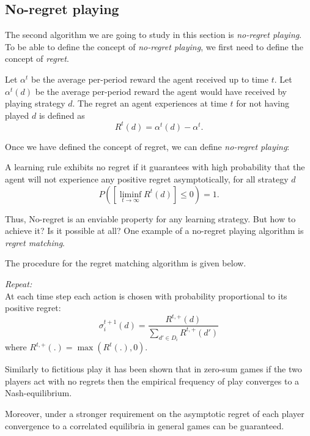 \subsection{No-regret playing}
The second algorithm we are going to study in this section is \emph{no-regret
playing}. To be able to define the concept of \emph{no-regret playing}, we
first need to define the concept of \emph{regret}.

\begin{definition}[Regret]
    Let $\alpha^t$ be the average per-period reward the agent received up to time
    $t$. Let $\alpha^t(d)$ be the average per-period reward the agent would have
    received by playing strategy $d$. The regret an agent experiences at
    time $t$ for not having played $d$ is defined as
    $$R^t(d) = \alpha^t(d) - \alpha^t.$$
\end{definition}

Once we have defined the concept of regret, we can define \emph{no-regret playing}:

\begin{definition}
    A learning rule exhibits no regret if it guarantees with high probability that
    the agent will not experience any positive regret asymptotically, for all strategy $d$
    $$P([\liminf_{t\rightarrow \infty} R^t(d)] \leq 0) = 1.$$
\end{definition}

Thus, No-regret is an enviable property for any learning strategy.
But how to achieve it? Is it possible at all?
One example of a no-regret playing algorithm is \emph{regret
matching}.

The procedure for the regret matching algorithm is given below.

\begin{procedure}
    \emph{Repeat:\\}
	\quad At each time step each action is chosen with probability proportional to its positive regret:\\
			$$\sigma_i^{t+1}(d)= \frac{R^{t,+}(d)}{\sum_{d'\in D_i} R^{t,+}(d')}$$
	where $R^{t,+}(.)=\max(R^t(.),0)$.
    \label{chap9:regretmatchproc}
\end{procedure}

Similarly to fictitious play it has been shown that in zero-sum games if the two players act with no regrets then the empirical frequency of play converges to a Nash-equilibrium.

Moreover, under a stronger requirement on the asymptotic regret of each player convergence to a correlated equilibria in general games can be guaranteed. 



\ifx \globalmark \undefined %


	
\else

\fi
